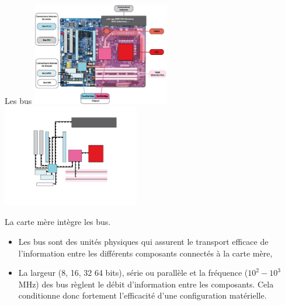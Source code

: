 \begin{frame}{Les bus}
  \includegraphics[width=6cm]{img/s01/carte_mere_commentee_2.jpg}%
  \includegraphics[width=6cm]{img/s01/carte_mere_commentee_3.jpg}%
  \begin{block}{La carte mère intègre les bus.}
    \begin{itemize}
    \item Les bus sont des unités physiques qui assurent le transport
      efficace de l'information entre les différents composants
      connectés à la carte mère,
    \item La largeur (8, 16, 32 64 bits), série ou parallèle et la
      fréquence ($10^2-10^3$ MHz) des bus règlent le débit d'information
      entre les composants. Cela conditionne donc fortement l'efficacité
      d'une configuration matérielle.
    \end{itemize}
  \end{block}
\end{frame}

